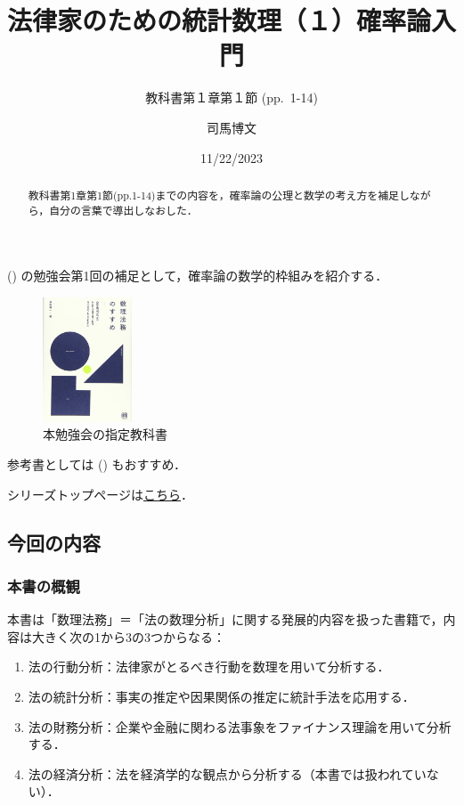 \documentclass[
  letterpaper,
  DIV=11,
  numbers=noendperiod]{scrartcl}
\title{法律家のための統計数理（１）確率論入門}
\subtitle{教科書第１章第１節 (pp.~1-14)}
\author{司馬博文}
\date{11/22/2023}
\providecommand{\tightlist}{%
  \setlength{\itemsep}{0pt}\setlength{\parskip}{0pt}}\usepackage{longtable,booktabs,array}
\renewcommand*\contentsname{Table of contents}
\newcommand\contentsname{Table of contents}
\begin{document}
\maketitle
\begin{abstract}
教科書第1章第1節(pp.1-14)までの内容を，確率論の公理と数学の考え方を補足しながら，自分の言葉で導出しなおした．
\end{abstract}

\renewcommand*\contentsname{Table of contents}
{
\hypersetup{linkcolor=}
\setcounter{tocdepth}{3}
\tableofcontents
}

()
の勉強会第1回の補足として，確率論の数学的枠組みを紹介する．

\begin{figure}[H]

{\centering \includegraphics[width=1.04167in,height=\textheight,keepaspectratio]{草野耕一.jpg}

}

\caption{本勉強会の指定教科書}

\end{figure}%

参考書としては ()
もおすすめ．

シリーズトップページは\href{../../../static/Sessions.qmd\#sec-法律家のための統計数理}{こちら}．

\subsection{今回の内容}\label{ux4ecaux56deux306eux5185ux5bb9}

\subsubsection{本書の概観}\label{ux672cux66f8ux306eux6982ux89b3}

本書は「数理法務」＝「法の数理分析」に関する発展的内容を扱った書籍で，内容は大きく次の1から3の3つからなる：

\begin{enumerate}
\def\labelenumi{\arabic{enumi}.}
\tightlist
\item
  法の行動分析：法律家がとるべき行動を数理を用いて分析する．
\item
  法の統計分析：事実の推定や因果関係の推定に統計手法を応用する．
\item
  法の財務分析：企業や金融に関わる法事象をファイナンス理論を用いて分析する．
\item
  法の経済分析：法を経済学的な観点から分析する（本書では扱われていない）．
\end{enumerate}
\end{document}
